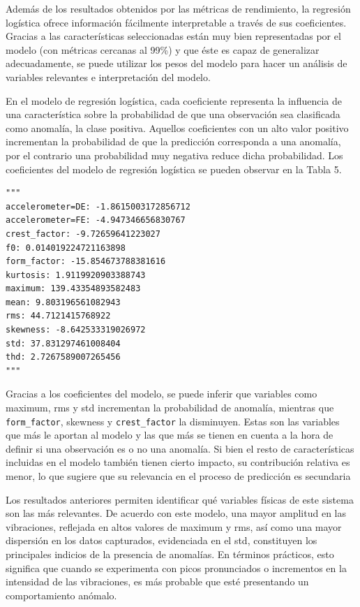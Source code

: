 \documentclass[11pt,a4paper,spanish]{book}
\numberwithin{equation}{chapter}
\numberwithin{figure}{chapter}
\begin{document}
Además de los resultados obtenidos por las métricas de rendimiento, la regresión logística ofrece información fácilmente interpretable a través de sus coeficientes. Gracias a las características seleccionadas están muy bien representadas por el modelo (con métricas cercanas al 99\%) y que éste es capaz de generalizar adecuadamente, se puede utilizar los pesos del modelo para hacer un análisis de variables relevantes e interpretación del modelo.  


En el modelo de regresión logística, cada coeficiente representa la influencia de una característica sobre la probabilidad de que una observación sea clasificada como anomalía, la clase positiva. Aquellos coeficientes con un alto valor positivo incrementan la probabilidad de que la predicción corresponda a una anomalía, por el contrario una probabilidad muy negativa reduce dicha probabilidad. Los coeficientes del modelo de regresión logística se pueden observar en la Tabla 5. 


\begin{lstlisting}
"""
accelerometer=DE: -1.8615003172856712
accelerometer=FE: -4.947346656830767
crest_factor: -9.72659641223027
f0: 0.014019224721163898
form_factor: -15.854673788381616
kurtosis: 1.9119920903388743
maximum: 139.43354893582483
mean: 9.803196561082943
rms: 44.7121415768922
skewness: -8.642533319026972
std: 37.831297461008404
thd: 2.7267589007265456
"""
\end{lstlisting}



Gracias a los coeficientes del modelo, se puede inferir que variables como maximum, rms y std incrementan la probabilidad de anomalía, mientras que \lstinline|form_factor|, skewness y \lstinline|crest_factor| la disminuyen. 
Estas son las variables que más le aportan al modelo y las que más se tienen en cuenta a la hora de definir si una observación es o no una anomalía. Si bien el resto de características incluidas en el modelo también tienen cierto impacto, su contribución relativa es menor, lo que sugiere que su relevancia en el proceso de predicción es secundaria


Los resultados anteriores permiten identificar qué variables físicas de este sistema son las más relevantes. De acuerdo con este modelo, una mayor amplitud en las vibraciones, reflejada en altos valores de maximum y rms, así como una mayor dispersión en los datos capturados, evidenciada en el std, constituyen los principales indicios de la presencia de anomalías. En términos prácticos, esto significa que cuando se experimenta con picos pronunciados o incrementos en la intensidad de las vibraciones, es más probable que esté presentando un comportamiento anómalo.
\end{document}
